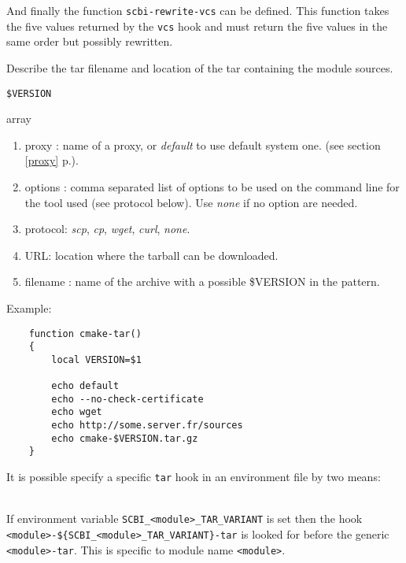 \documentclass[a4paper,12pt,twoside]{article}
\newcommand{\code}[1]{\texttt{#1}}
\renewcommand{\emph}[1]{\textit{#1}}
\newcommand{\seeref}[1]{see section \ref{#1} p.\pageref{#1}}
\begin{document}
\begin{description}[font=\large\texttt]
	And finally the function \code{scbi-rewrite-vcs} can be defined. This function takes the five values returned by the \code{vcs} hook and must return the five values in the same order but possibly rewritten.

	\item[<module>{[}-<variant>{]}-tar] Describe the tar filename and location of the tar containing the module sources.
	\begin{description}[font=\textit,style=standard]
		\item[parameter] \tabto{2cm} \code{\$VERSION}
		\item[return] \tabto{2cm} array
		\begin{enumerate}
		\item proxy : name of a proxy, or \emph{default} to use default system one. (\seeref{proxy}).
		\item options : comma separated list of options to be used on the command line for the tool used (see protocol below). Use \emph{none} if no option are needed.
		\item protocol: \emph{scp}, \emph{cp}, \emph{wget}, \emph{curl}, \emph{none}.
		\item URL: location where the tarball can be downloaded.
		\item filename : name of the archive with a possible \$VERSION in the pattern.
		\end{enumerate}
	\end{description}

	Example:
	\begin{lstlisting}
	function cmake-tar()
	{
		local VERSION=$1

		echo default
		echo --no-check-certificate
		echo wget
		echo http://some.server.fr/sources
		echo cmake-$VERSION.tar.gz
	}
	\end{lstlisting}

	It is possible specify a specific \code{tar} hook in an environment file by two means:

	\begin{description}[style=standard]
		\item[\code{SCBI\_<module>\_TAR\_VARIANT}] \hfill \\
		If environment variable \code{SCBI\_<module>\_TAR\_VARIANT} is set then the hook \\ \code{<module>-\$\{SCBI\_<module>\_TAR\_VARIANT\}-tar} is looked for before the generic \code{<module>-tar}. This is specific to module name \code{<module>}.


\end{description}
\end{description}
\end{document}
